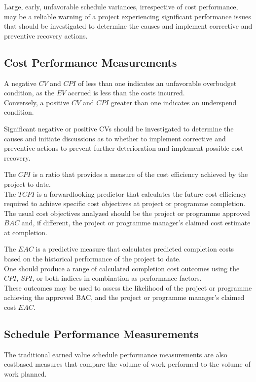 \documentclass[letterpaper,10pt,english]{jupyterBook}
\begin{document}
\sphinxAtStartPar
Large, early, unfavorable schedule variances, irrespective of cost performance, may be a reliable warning of a project experiencing significant performance issues that should be investigated to determine the causes and implement corrective and preventive recovery actions.


\subsection{Cost Performance Measurements}
\label{\detokenize{PM/evm:cost-performance-measurements}}
\sphinxAtStartPar
A negative \(CV\) and \(CPI\) of less than one indicates an unfavorable over\sphinxhyphen{}budget condition, as the \(EV\) accrued is less than the costs incurred. \\
Conversely, a positive \(CV\) and \(CPI\) greater than one indicates an under\sphinxhyphen{}spend condition.

\sphinxAtStartPar
Significant negative or positive CVs should be investigated to determine the causes and initiate discussions as to whether to implement corrective and preventive actions to prevent further deterioration and implement possible cost recovery.

\sphinxAtStartPar
The \(CPI\) is a ratio that provides a measure of the cost efficiency achieved by the project to date. \\
The \(TCPI\) is a forward\sphinxhyphen{}looking predictor that calculates the future cost efficiency required to achieve specific cost objectives at project or programme completion. \\
The usual cost objectives analyzed should be the project or programme approved \(BAC\) and, if different, the project or programme manager’s claimed cost estimate at completion.

\sphinxAtStartPar
The \(EAC\) is a predictive measure that calculates predicted completion costs based on the historical performance of the project to date. \\
One should produce a range of calculated completion cost outcomes using the \(CPI\), \(SPI\), or both indices in combination as performance factors. \\
These outcomes may be used to assess the likelihood of the project or programme achieving the approved BAC, and the project or programme manager’s claimed cost \(EAC\).


\subsection{Schedule Performance Measurements}
\label{\detokenize{PM/evm:schedule-performance-measurements}}
\sphinxAtStartPar
The traditional earned value schedule performance measurements are also cost\sphinxhyphen{}based measures that compare the volume of work performed to the volume of work planned.
\end{document}
